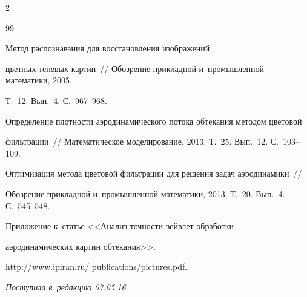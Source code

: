 \begin{multicols}{2}
{{\begin{thebibliography}{99}
    


     Метод распознавания для восстановления изображений 

    цветных теневых картин~// Обозрение прикладной и~промышленной математики, 2005. 

    Т.~12. Вып.~4. С.~967--968.



    Определение плот\-ности аэродинамического потока обтекания методом цветовой 

    фильтрации~// Математическое моделирование, 2013. Т.~25. Вып.~12. С.~103--109.



    Оптимизация метода цветовой фильтрации для решения задач аэродинамики~// 

    Обозрение прикладной и~промышленной математики, 2013. Т.~20. Вып.~4. С.~545--548.



    Приложение \mbox{к~статье} <<Анализ точности вей\-в\-лет-об\-ра\-бот\-ки 

    аэродинамических картин обтекания>>. 

    {\sf http://www.ipiran.ru/ \mbox{publications/pictures.pdf}}.

\end{thebibliography}



 }

 }



\end{multicols}



\vspace*{-6pt}



\hfill{\small\textit{Поступила в~редакцию 07.05.16}}



\vspace*{8pt}









